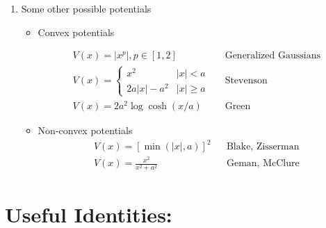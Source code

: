 \documentclass[12pt,twoside]{article}
\begin{document}
\begin{enumerate}
	\item Some other possible potentials
	\begin{itemize}
		\item Convex potentials

		\begin{align*}
			V(x) = \vert x ^p\vert , p\in[1,2]	&&\text{Generalized Gaussians}\\
			V(x) = \begin{cases} x^2	& \vert x \vert <a \\ 2a\vert x\vert - a^2 & \vert x \vert \geq a \end{cases} 	&&\text{Stevenson}\\
			V(x) = 2a^2 \log \cosh (x/a)			&&\text{Green}
		\end{align*}
		
		\item Non-convex potentials
		\begin{align*}
			V(x) = \left[\min(\vert x \vert, a)\right]^2 		&&	\text{Blake, Zisserman}\\
			V(x) = \frac{x^2}{x^2 + a^2}								&&	\text{Geman, McClure}			
		\end{align*}			
		
	\end{itemize}
\end{enumerate}


\newpage

\section{Useful Identities:}
\end{document}
